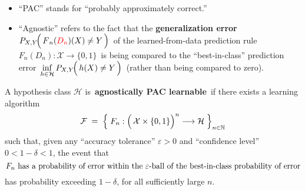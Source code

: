 
\vskip 1.0cm
\begin{remark}
\mbox{}\vskip -0.1cm
\begin{itemize}
\item
	``PAC'' stands for ``probably approximately correct.''
\item
	``Agnostic'' refers to the fact that the \textbf{generalization error}
	\,$P_{X,Y}\!\!\left(\,\overset{{\color{white}.}}{F}_{n}({\color{red}D_{n}})(X) \neq Y \,\right)$\,
	of the learned-from-data prediction rule \,$F_{n}(D_{n}) : \mathcal{X} \longrightarrow \{0,1\}$\,
	is being compared to the ``best-in-class'' prediction error
	\,$\underset{h\in\mathcal{H}}{\inf}\,P_{X,Y}\!\!\left(\,\overset{{\color{white}.}}{h}(X) \neq Y \,\right)$\,
	(rather than being compared to zero).
\end{itemize}
\end{remark}


\vskip 1.0cm
\begin{remark}
\mbox{}\vskip 0.1cm
\noindent
A hypothesis class $\mathcal{H}$ is \,\textbf{agnostically PAC learnable}\, if
there exists a learning algorithm
\begin{equation*}
\mathcal{F} \; = \; \left\{\;
	F_{n} : \left(\,\mathcal{X}\overset{{\color{white}.}}{\times}\{0,1\}\right)^{n} \longrightarrow\mathcal{H}
	\;\right\}_{n\in\N}
\end{equation*}
such that, given any ``accuracy tolerance'' $\varepsilon > 0$ and
``confidence level'' $0 <1 - \delta < 1$, 
the event that
\begin{equation*}
\textnormal{$F_{n}$ has a probability of error within the $\varepsilon$-ball of
the best-in-class probability of error}
\end{equation*}
has probability exceeding $1 - \delta$, for all sufficiently large $n$.
\end{remark}


